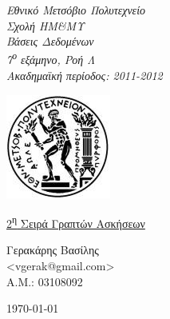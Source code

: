 \begin{titlepage}
\begin{center}

\noindent\begin{minipage}[b]{.55\textwidth}
\begin{Large}
\emph{Εθνικό Μετσόβιο Πολυτεχνείο\\
Σχολή ΗΜ\&ΜΥ\\
Βάσεις Δεδομένων\\
7\textsuperscript{ο} εξάμηνο, Ροή Λ\\
Ακαδημαϊκή περίοδος: 2011-2012\\}
\end{Large}
\end{minipage}%
\begin{minipage}[b]{.45\textwidth}
     \centering
     \includegraphics[scale=0.8]{title/ntua_logo}
\end{minipage}

\vspace{5cm}
\begin{huge}
\underline{2\textsuperscript{η} Σειρά Γραπτών Ασκήσεων}
\end{huge}
\vfill

\begin{flushright}
\Large{Γερακάρης Βασίλης}\\
\large{<vgerak@gmail.com> }\\
\large{Α.Μ.: 03108092}\\
\end{flushright}
\vspace{1cm}

\large\today\\
\end{center}
\end{titlepage}

